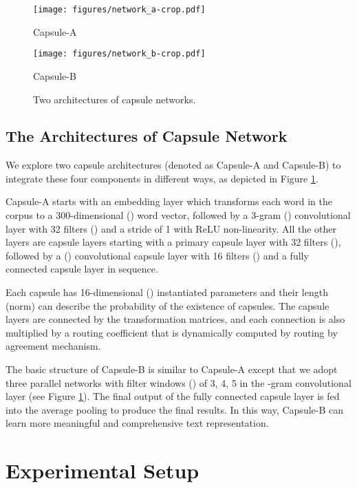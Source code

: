 \documentclass[11pt]{article}
\begin{document}
\begin{figure}
\begin{minipage}{0.3\linewidth}  
	\centerline{\texttt{[image: figures/network\_a-crop.pdf]}}  
	\centerline{Capsule-A}  
\end{minipage} 
\begin{minipage}{0.68\linewidth}  
	\centerline{\texttt{[image: figures/network\_b-crop.pdf]}}  
	\centerline{Capsule-B}  
\end{minipage}  
\caption{Two architectures of capsule networks.}  
\label{fig:schema}
\vspace{-0.5cm}
\end{figure} 



\subsection{The Architectures of Capsule Network}
We explore two capsule architectures (denoted as Capsule-A and Capsule-B) to integrate these four components in different ways, as depicted in Figure \ref{fig:schema}. 

Capsule-A starts with an embedding layer which transforms each word in the corpus to a 300-dimensional () word vector, followed by a 3-gram () convolutional layer with 32 filters () and  a stride of 1 with ReLU non-linearity.  All the other layers are capsule layers starting with a  primary capsule layer with 32 filters (), followed by a  () convolutional capsule layer with 16 filters () and a fully connected capsule layer in sequence. 

Each capsule has 16-dimensional () instantiated parameters and their length (norm) can describe the probability of the existence of capsules. 
The capsule layers are connected by the transformation matrices, and each connection is also multiplied by a routing coefficient that is dynamically computed by routing by agreement mechanism. 




The basic structure of Capsule-B is similar to Capsule-A except that we adopt three parallel networks with filter
windows () of 3, 4, 5 in the -gram convolutional layer (see Figure \ref{fig:schema}). The final output of the fully connected capsule layer is fed into the average pooling to produce the final results. In this way, Capsule-B can learn more meaningful and comprehensive text representation. 



\section{Experimental Setup}
\end{document}
